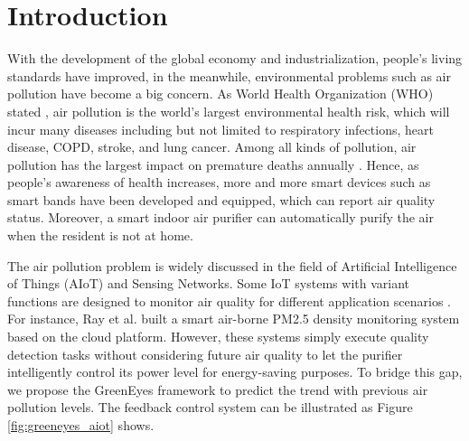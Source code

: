\documentclass[sigconf]{acmart}
\begin{document}
\maketitle


\section{Introduction}

With the development of the global economy and industrialization, people's living standards have improved, in the meanwhile, environmental problems such as air pollution have become a big concern. As World Health Organization (WHO) stated \cite{world2016ambient}, air pollution is the world's largest environmental health risk, which will incur many diseases including but not limited to respiratory infections, heart disease, COPD, stroke, and lung cancer. Among all kinds of pollution, air pollution has the largest impact on premature deaths annually \cite{lelieveld2015contribution}. Hence, as people's awareness of health increases, more and more smart devices such as smart bands have been developed and equipped, which can report air quality status. Moreover, a smart indoor air purifier can automatically purify the air when the resident is not at home.

The air pollution problem is widely discussed in the field of Artificial Intelligence of Things (AIoT) and Sensing Networks. Some IoT systems with variant functions are designed to monitor air quality for different application scenarios \cite{kumar2017air, oh2015indoor, zheng2016design}. For instance, Ray et al. \cite{ray2016internet} built a smart air-borne PM2.5 density monitoring system based on the cloud platform. However, these systems simply execute quality detection tasks without considering future air quality to let the purifier intelligently control its power level for energy-saving purposes. To bridge this gap, we propose the GreenEyes framework to predict the trend with previous air pollution levels. The feedback control system can be illustrated as Figure \ref{fig:greeneyes_aiot} shows.
\end{document}
